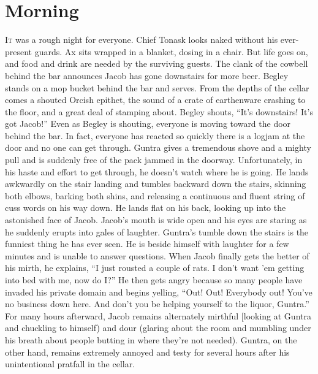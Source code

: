 \documentclass[a5paper,11pt,twoside]{book}
\newcommand{\firstLetter}[1]{\lettrine[loversize=0.3,
lines=3,
slope=-0.1em,
nindent=5pt,
lhang=0.35]{#1}
}
\begin{document}
{{{\section*{Morning} \firstLetter{I}t was a rough night for everyone.
Chief Tonask looks naked without his ever-present guards.
Ax sits wrapped in a blanket, dosing in a chair.
But life goes on, and food and drink are needed by the surviving guests.
The clank of the cowbell behind the bar announces Jacob has gone downstairs for more beer.
Begley stands on a mop bucket behind the bar and serves.
From the depths of the cellar comes a shouted Orcish epithet, the sound of a crate of earthenware crashing to the floor, and a great deal of stamping about.
Begley shouts, “It’s downstairs! It’s got Jacob!” Even as Begley is shouting, everyone is moving toward the door behind the bar.
In fact, everyone has reacted so quickly there is a logjam at the door and no one can get through.
Guntra gives a tremendous shove and a mighty pull and is suddenly free of the pack jammed in the doorway.
Unfortunately, in his haste and effort to get through, he doesn't watch where  he is going.
He lands awkwardly on the stair landing and tumbles backward down the stairs, skinning both elbows, barking both shins, and releasing a continuous and fluent string of cuss words on his way down.
He lands flat on his back, looking up into the astonished face of Jacob.
Jacob’s mouth is wide open and his eyes are staring as he suddenly erupts into gales of laughter.
Guntra’s tumble down the stairs is the funniest thing he has ever seen.
He is beside himself with laughter for a few minutes and is unable to answer questions.
When Jacob finally gets the better of his mirth, he explains, “I just rousted a couple of rats.
I don’t want ’em getting into bed with me, now do I?” He then gets angry because so many people have invaded his private domain and begins yelling, “Out! Out! Everybody out! You’ve no business down here.
And don’t you be helping yourself to the liquor, Guntra.” For many hours afterward, Jacob remains alternately mirthful [looking at Guntra and chuckling to himself) and dour (glaring about the room and mumbling under his breath about people butting in where they’re not needed).
Guntra, on the other hand, remains extremely annoyed and testy for several hours after his unintentional pratfall in the cellar.
}}}
\end{document}

